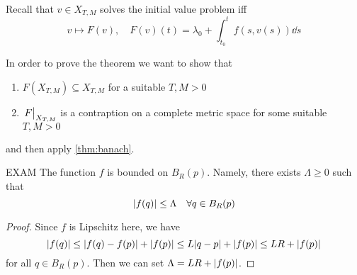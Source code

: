 \documentclass[12pt]{extarticle}
\begin{document}
Recall that $v \in X_{T, M}$ solves the initial value problem iff
\begin{equation}
    v \mapsto F(v), \quad F(v)(t) = \lambda_0 + \int^t_{t_0} f(s, v(s)) \dd s
\end{equation}

In order to prove the theorem we want to show that
\begin{enumerate}
    \item $F(X_{T, M}) \subseteq X_{T, M}$ for a suitable $T, M >0$
    \item $\eval{F}_{X_{T, M}}$ is a contraption on a complete metric space for some suitable $T, M > 0$
\end{enumerate}
and then apply \cref{thm:banach}.

\begin{proposition}{EXAM}{}
    The function $f$ is bounded on $B_R(p)$.
    Namely, there exists $\Lambda \geq 0$ such that
    \begin{equation}
        \abs{f(q)} \leq \Lambda \quad \forall q \in B_R(p)
    \end{equation}
\end{proposition}

\begin{proof}
    Since $f$ is Lipschitz here, we have
    \begin{equation}
        \abs{f(q)} \leq \abs{f(q)-f(p)} + \abs{f(p)} \leq L \abs{q-p} + \abs{f(p)} \leq L R + \abs{f(p)}
    \end{equation}
    for all $q \in B_R(p)$.
    Then we can set $\Lambda = LR + \abs{f(p)}$.
\end{proof}
\end{document}
